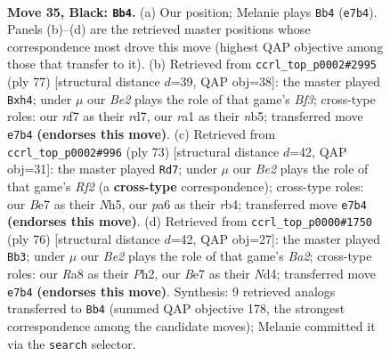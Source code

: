 \documentclass[11pt]{article}
\begin{document}
\clearpage

\begin{figure}[p]\centering
\begin{subfigure}{0.46\textwidth}\centering
\resizebox{\linewidth}{!}{%
\newchessgame
\chessboard[
  setfen={r7/p3bN1k/P5p1/1P4P1/5P2/2N5/8/R1B1K3 b Q - 4 35},
  showmover=false,
  pgfstyle=straightmove, color=movearrow, markmove={e7-b4}
]}
\caption{}
\end{subfigure}\hfill
\begin{subfigure}{0.46\textwidth}\centering
\resizebox{\linewidth}{!}{%
\newchessgame
\chessboard[
  setfen={6k1/3R4/2r1pbpp/1N6/3P1P1P/8/5P2/6K1 b - - 0 39},
  showmover=false,
  pgfstyle=straightmove, color=movearrow, markmove={f6-h4}
]}
\caption{}
\end{subfigure}
\\[4pt]
\begin{subfigure}{0.46\textwidth}\centering
\resizebox{\linewidth}{!}{%
\newchessgame
\chessboard[
  setfen={8/5r1k/p5pp/3N3n/PR3P2/7P/6P1/7K b - - 3 37},
  showmover=false,
  pgfstyle=straightmove, color=movearrow, markmove={f7-d7}
]}
\caption{}
\end{subfigure}\hfill
\begin{subfigure}{0.46\textwidth}\centering
\resizebox{\linewidth}{!}{%
\newchessgame
\chessboard[
  setfen={R7/1r1bn1k1/5p2/1p1p3p/3N1P2/6P1/B4K1P/8 w - - 0 39},
  showmover=false,
  pgfstyle=straightmove, color=movearrow, markmove={a2-b3}
]}
\caption{}
\end{subfigure}
\caption{\textbf{Move 35, Black: \texttt{Bb4}.} (a) Our position; Melanie plays \texttt{Bb4} (\texttt{e7b4}). Panels (b)--(d) are the retrieved master positions whose correspondence most drove this move (highest QAP objective among those that transfer to it). (b) Retrieved from \texttt{ccrl\_top\_p0002\#2995} (ply 77) [structural distance $d$=39, QAP obj=38]: the master played \texttt{Bxh4}; under $\mu$ our \emph{Be2} plays the role of that game's \emph{Bf3}; cross-type roles: our \emph{n}f7 as their \emph{r}d7, our \emph{r}a1 as their \emph{n}b5; transferred move \texttt{e7b4} \textbf{(endorses this move)}. (c) Retrieved from \texttt{ccrl\_top\_p0002\#996} (ply 73) [structural distance $d$=42, QAP obj=31]: the master played \texttt{Rd7}; under $\mu$ our \emph{Be2} plays the role of that game's \emph{Rf2} (a \textbf{cross-type} correspondence); cross-type roles: our \emph{B}e7 as their \emph{N}h5, our \emph{p}a6 as their \emph{r}b4; transferred move \texttt{e7b4} \textbf{(endorses this move)}. (d) Retrieved from \texttt{ccrl\_top\_p0000\#1750} (ply 76) [structural distance $d$=42, QAP obj=27]: the master played \texttt{Bb3}; under $\mu$ our \emph{Be2} plays the role of that game's \emph{Ba2}; cross-type roles: our \emph{R}a8 as their \emph{P}h2, our \emph{B}e7 as their \emph{N}d4; transferred move \texttt{e7b4} \textbf{(endorses this move)}. Synthesis: 9 retrieved analogs transferred to \texttt{Bb4} (summed QAP objective 178, the strongest correspondence among the candidate moves); Melanie committed it via the \texttt{search} selector.}
\label{fig:thought-m69}
\end{figure}
\end{document}
